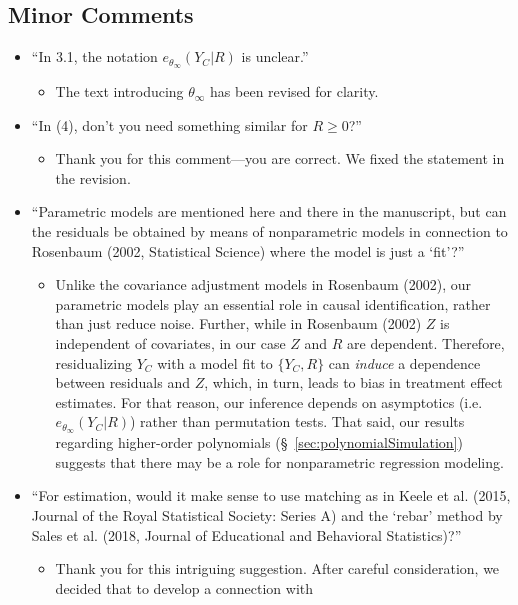 \documentclass[12pt]{article}
\newcommand{\InfPar}[1]{\ensuremath{{#1}_{\infty}}}
\newcommand{\thetaInf}{\InfPar{\theta}}
\newcommand{\dt}[3][\theta]{\ensuremath{e_{#1}(#2| {#3})}}
\begin{document}
\subsection{Minor Comments}
\begin{itemize}
\item ``In 3.1, the notation $\dt[\thetaInf]{Y_{C}}{ R }$ is unclear.''
\begin{itemize}
  \item The text introducing $\thetaInf$ has been revised for clarity.
\end{itemize}
\item ``In (4), don’t you need something similar for $R\ge 0$?''
\begin{itemize}
 \item Thank you for this comment---you are correct. We fixed the
   statement in the revision.
 \end{itemize}
\item ``Parametric models are mentioned here and there in the
  manuscript, but can the residuals be obtained by means of
  nonparametric models in connection to Rosenbaum (2002, Statistical
  Science) where the model is just a `fit'?''
\begin{itemize}
 \item Unlike the covariance adjustment models in Rosenbaum (2002), our parametric models play an
   essential role in causal identification, rather than just reduce
   noise. Further, while in Rosenbaum (2002) $Z$ is independent of
   covariates, in our case $Z$ and $R$ are dependent. Therefore,
   residualizing $Y_C$ with a model fit to $\{Y_C,R\}$
   can \emph{induce} a dependence between residuals and $Z$, which, in turn, leads to
   bias in treatment effect estimates. For that reason, our inference
   depends on asymptotics (i.e. $\dt[\thetaInf]{Y_C}{R}$) rather than
   permutation tests. That said, our results regarding higher-order
   polynomials (\S~\ref{sec:polynomialSimulation}) suggests that there may be a role for nonparametric
   regression modeling.
\end{itemize}
\item ``For estimation, would it make sense to use matching as in Keele
  et al. (2015, Journal of the Royal Statistical Society: Series A)
  and the `rebar' method by Sales et al. (2018, Journal of Educational
  and Behavioral Statistics)?''
 \begin{itemize}
   \item Thank you for this intriguing suggestion. After careful
     consideration, we decided that to develop a connection with

\end{itemize}
\end{itemize}
\end{document}
